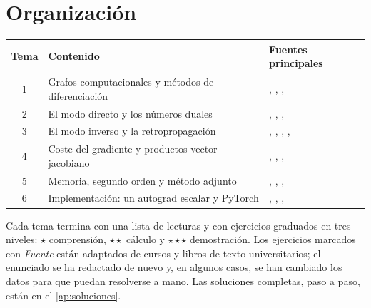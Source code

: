 \documentclass[11pt,a4paper,twoside,openany]{book}
\begin{document}
\section*{Organización}
\begin{center}\small
\begin{tabular}{@{}cll@{}}
\toprule
Tema & Contenido & Fuentes principales \\
\midrule
1 & Grafos computacionales y métodos de diferenciación & \cite{baydin}, \cite{gw}, \cite{gbc}, \cite{mit18337} \\
2 & El modo directo y los números duales & \cite{baydin}, \cite{gw}, \cite{mit18337}, \cite{mit18s096} \\
3 & El modo inverso y la retropropagación & \cite{baydin}, \cite{gw}, \cite{gbc}, \cite{cs231n}, \cite{d2l} \\
4 & Coste del gradiente y productos vector-jacobiano & \cite{gw}, \cite{baydin}, \cite{grosse}, \cite{kaplan} \\
5 & Memoria, segundo orden y método adjunto & \cite{gw}, \cite{chen}, \cite{pearlmutter}, \cite{cs336a2} \\
6 & Implementación: un autograd escalar y PyTorch & \cite{karpathy}, \cite{paszke}, \cite{pytorch}, \cite{cmu11785} \\
\bottomrule
\end{tabular}
\end{center}

Cada tema termina con una lista de lecturas y con ejercicios graduados en tres niveles: $\star$ comprensión, $\star\star$ cálculo y $\star\star\star$ demostración. Los ejercicios marcados con \emph{Fuente} están adaptados de cursos y libros de texto universitarios; el enunciado se ha redactado de nuevo y, en algunos casos, se han cambiado los datos para que puedan resolverse a mano. Las soluciones completas, paso a paso, están en el \cref{ap:soluciones}.
\end{document}
